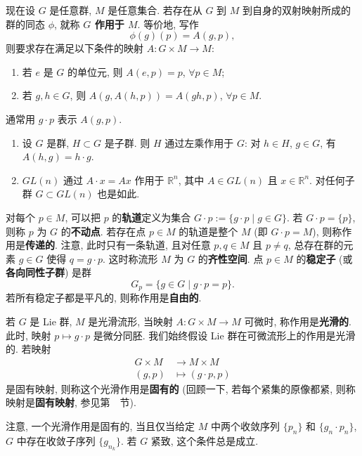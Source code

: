 现在设 $G$ 是任意群, $M$ 是任意集合. 若存在从 $G$ 到 $M$ 到自身的双射映射所成的群的同态 $\phi$, 就称 \label{idx:group-action-definition}\textbf{$G$ 作用于 $M$}. 等价地, 写作
\[
  \phi(g)(p)=A(g,p),
\]
则要求存在满足以下条件的映射 $A:G\times M\to M$:
\begin{enumerate}[label=(\roman*),leftmargin=*]
\item 若 $e$ 是 $G$ 的单位元, 则 $A(e,p)=p$, $\forall p\in M$;
\item 若 $g,h\in G$, 则 $A(g,A(h,p))=A(gh,p)$, $\forall p\in M$.
\end{enumerate}
通常用 $g\cdot p$ 表示 $A(g,p)$.

\begin{RiemannExample}\label{ex:group-actions-by-left-multiplication}
\begin{enumerate}[label=(\arabic*),leftmargin=*]
\item 设 $G$ 是群, $H\subset G$ 是子群. 则 $H$ 通过左乘作用于 $G$: 对 $h\in H$, $g\in G$, 有 $A(h,g)=h\cdot g$.
\item $GL(n)$ 通过 $A\cdot x=Ax$ 作用于 $\mathbb{R}^n$, 其中 $A\in GL(n)$ 且 $x\in\mathbb{R}^n$. 对任何子群 $G\subset GL(n)$ 也是如此.
\end{enumerate}
\end{RiemannExample}

对每个 $p\in M$, 可以把 $p$ 的\textbf{轨道}定义为集合 $G\cdot p:=\{g\cdot p\mid g\in G\}$. 若 $G\cdot p=\{p\}$, 则称 $p$ 为 $G$ 的\textbf{不动点}. 若存在点 $p\in M$ 的轨道是整个 $M$ (即 $G\cdot p=M$), 则称作用是\textbf{传递的}. 注意, 此时只有一条轨道, 且对任意 $p,q\in M$ 且 $p\ne q$, 总存在群的元素 $g\in G$ 使得 $q=g\cdot p$. 这时称流形 $M$ 为 $G$ 的\textbf{齐性空间}. 点 $p\in M$ 的\textbf{稳定子} (或\textbf{各向同性子群}) 是群
\[
  G_p=\{g\in G\mid g\cdot p=p\}.
\]
若所有稳定子都是平凡的, 则称作用是\textbf{自由的}.

若 $G$ 是 Lie 群, $M$ 是光滑流形, 当映射 $A:G\times M\to M$ 可微时, 称作用是\textbf{光滑的}. 此时, 映射 $p\mapsto g\cdot p$ 是微分同胚. 我们始终假设 Lie 群在可微流形上的作用是光滑的. 若映射
\begin{align*}
  G\times M&\to M\times M\\
  (g,p)&\mapsto(g\cdot p,p)
\end{align*}
是固有映射, 则称这个光滑作用是\textbf{固有的} (回顾一下, 若每个紧集的原像都紧, 则称映射是\textbf{固有映射}, 参见第~~节).

\begin{RiemannRemark}\label{rem:sequential-characterization-of-proper-actions}
注意, 一个光滑作用是固有的, 当且仅当给定 $M$ 中两个收敛序列 $\{p_n\}$ 和 $\{g_n\cdot p_n\}$, $G$ 中存在收敛子序列 $\{g_{n_k}\}$. 若 $G$ 紧致, 这个条件总是成立.
\end{RiemannRemark}

